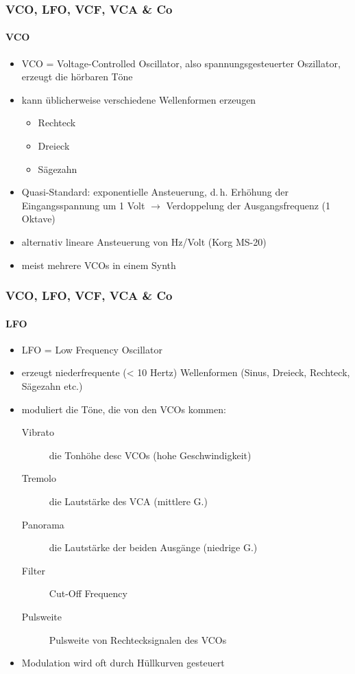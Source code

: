 \documentclass[11pt,ngerman]{beamer}
\begin{document}
\begin{frame}
\frametitle{VCO, LFO, VCF, VCA \& Co}
\framesubtitle{VCO}

\begin{itemize}
	\item VCO = Voltage-Controlled Oscillator, also spannungsgesteuerter Oszillator, erzeugt die hörbaren Töne
	\item kann üblicherweise verschiedene Wellenformen erzeugen
	\begin{itemize}
		\item Rechteck
		\item Dreieck
		\item Sägezahn
	\end{itemize}
	
	\item Quasi-Standard: exponentielle Ansteuerung, d.\,h. Erhöhung der Eingangsspannung um 1 Volt $\rightarrow$ Verdoppelung der Ausgangsfrequenz (1 Oktave)
	\item alternativ lineare Ansteuerung von Hz/Volt (Korg MS-20)
	\item meist mehrere VCOs in einem Synth 
\end{itemize}

\end{frame}

\begin{frame}
\frametitle{VCO, LFO, VCF, VCA \& Co}
\framesubtitle{LFO}

\begin{itemize}
\item LFO = Low Frequency Oscillator
\item erzeugt niederfrequente (< 10 Hertz) Wellenformen (Sinus, Dreieck, Rechteck, Sägezahn etc.)
\item moduliert die Töne, die von den VCOs kommen:

\begin{description}
\item[Vibrato] die Tonhöhe desc VCOs (hohe Geschwindigkeit)
\item[Tremolo] die Lautstärke des VCA (mittlere G.)
\item[Panorama] die Lautstärke der beiden Ausgänge (niedrige G.)
\item[Filter] Cut-Off Frequency
\item[Pulsweite] Pulsweite von Rechtecksignalen des VCOs
\end{description}

\item Modulation wird oft durch Hüllkurven gesteuert
\end{itemize}
\end{frame}
\end{document}
